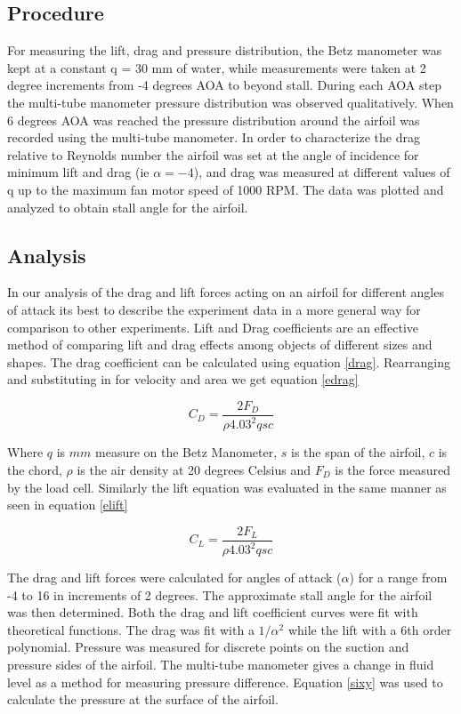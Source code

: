 \documentclass[paper=a4, fontsize=11pt, abstract=on]{scrartcl}
\numberwithin{equation}{section}		%
\numberwithin{figure}{section}			%
\numberwithin{table}{section}				%
\begin{document}
\subsection{Procedure}
For measuring the lift, drag and pressure distribution, the Betz manometer was kept at a constant q = 30 mm of water, while measurements were taken at 2 degree increments from -4 degrees AOA to beyond stall. During each AOA step the  multi-tube manometer pressure distribution was observed qualitatively. When 6 degrees AOA was reached the pressure distribution around the airfoil was recorded using the multi-tube manometer. In order to characterize the drag relative to Reynolds number the airfoil was set at the angle of incidence for minimum lift and drag (ie $\alpha =-4$), and drag was measured at different values of q up to the maximum fan motor speed of 1000 RPM. The data was plotted and analyzed to obtain stall angle for the airfoil.

\subsection{Analysis}
 In our analysis of the drag and lift forces acting on an airfoil for different angles of attack its best to describe the experiment data in a more general way for comparison to other experiments. Lift and Drag coefficients are an effective method of comparing lift and drag effects among objects of different sizes and shapes. The drag coefficient can be calculated using equation \ref{drag}. Rearranging and substituting in for velocity and area we get equation \ref{edrag}
 
 \begin{equation}
\label{edrag}
C_D= \frac{2F_D}{\rho4.03^2 q s c}
\end{equation}

Where $q$ is $mm$ measure on the Betz Manometer, $s$ is the span of the airfoil, $c$ is the chord, $\rho$ is the air density at 20 degrees Celsius and $F_D$ is the force measured by the load cell. Similarly the lift equation was evaluated in the same manner as seen in equation \ref{elift}


 \begin{equation}
\label{elift}
C_L= \frac{2F_L}{\rho4.03^2 q s c}
\end{equation}

The drag and lift forces were calculated for angles of attack ($\alpha$) for a range from -4 to 16 in increments of 2 degrees. The approximate stall angle for the airfoil was then determined. Both the drag and lift coefficient curves were fit with theoretical functions. The drag was fit with a $1/\alpha^2$ while the lift with a 6th order polynomial. Pressure was measured for discrete points on the suction and pressure sides of the airfoil. The multi-tube manometer gives a change in fluid level as a method for measuring pressure difference. Equation \ref{sixy} was used to calculate the pressure at the surface of the airfoil.
\end{document}

